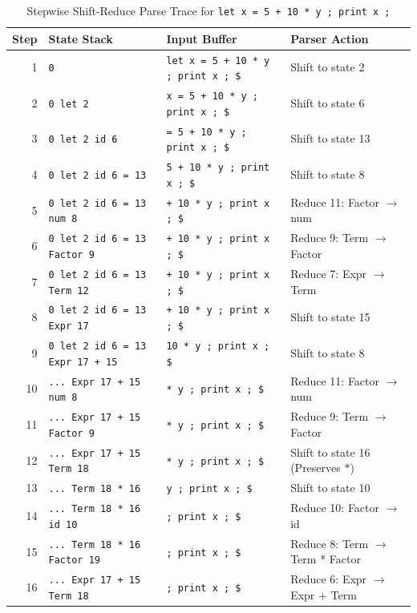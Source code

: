 \documentclass[11pt,a4paper]{article}
\begin{document}
\begin{table}[h]
\centering
\scriptsize
\caption{Stepwise Shift-Reduce Parse Trace for \texttt{let x = 5 + 10 * y ; print x ;}}
\label{tab:trace}
\begin{tabular}{rlll}
\toprule
\textbf{Step} & \textbf{State Stack} & \textbf{Input Buffer} & \textbf{Parser Action} \\
\midrule
1  & \texttt{0} & \texttt{let x = 5 + 10 * y ; print x ; \$} & Shift to state 2 \\
2  & \texttt{0 let 2} & \texttt{x = 5 + 10 * y ; print x ; \$} & Shift to state 6 \\
3  & \texttt{0 let 2 id 6} & \texttt{= 5 + 10 * y ; print x ; \$} & Shift to state 13 \\
4  & \texttt{0 let 2 id 6 = 13} & \texttt{5 + 10 * y ; print x ; \$} & Shift to state 8 \\
5  & \texttt{0 let 2 id 6 = 13 num 8} & \texttt{+ 10 * y ; print x ; \$} & Reduce 11: Factor $\to$ num \\
6  & \texttt{0 let 2 id 6 = 13 Factor 9} & \texttt{+ 10 * y ; print x ; \$} & Reduce 9: Term $\to$ Factor \\
7  & \texttt{0 let 2 id 6 = 13 Term 12} & \texttt{+ 10 * y ; print x ; \$} & Reduce 7: Expr $\to$ Term \\
8  & \texttt{0 let 2 id 6 = 13 Expr 17} & \texttt{+ 10 * y ; print x ; \$} & Shift to state 15 \\
9  & \texttt{0 let 2 id 6 = 13 Expr 17 + 15} & \texttt{10 * y ; print x ; \$} & Shift to state 8 \\
10 & \texttt{... Expr 17 + 15 num 8} & \texttt{* y ; print x ; \$} & Reduce 11: Factor $\to$ num \\
11 & \texttt{... Expr 17 + 15 Factor 9} & \texttt{* y ; print x ; \$} & Reduce 9: Term $\to$ Factor \\
12 & \texttt{... Expr 17 + 15 Term 18} & \texttt{* y ; print x ; \$} & Shift to state 16 (Preserves $*$) \\
13 & \texttt{... Term 18 * 16} & \texttt{y ; print x ; \$} & Shift to state 10 \\
14 & \texttt{... Term 18 * 16 id 10} & \texttt{; print x ; \$} & Reduce 10: Factor $\to$ id \\
15 & \texttt{... Term 18 * 16 Factor 19} & \texttt{; print x ; \$} & Reduce 8: Term $\to$ Term * Factor \\
16 & \texttt{... Expr 17 + 15 Term 18} & \texttt{; print x ; \$} & Reduce 6: Expr $\to$ Expr + Term \\

\end{tabular}
\end{table}
\end{document}
